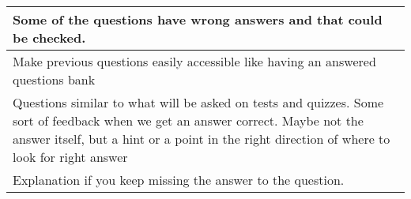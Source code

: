 \begin{longtable}{|p{1\linewidth}|}
		\hline
		Some of the questions have wrong answers and that could be checked.                                                                                                                                                                                                                                                                                                                                                                                                                                                                                                                                                                                                                              \\
		\hline
		Make previous questions easily accessible like having an answered questions bank                                                                                                                                                                                                                                                                                                                                                                                                                                                                                                                                                                                                                 \\
		\hline
		Questions similar to what will be asked on tests and quizzes. Some sort of feedback when we get an answer correct. Maybe not the answer itself, but a hint or a point in the right direction of where to look for right answer                                                                                                                                                                                                                                                                                                                                                                                                                                                                   \\
		\hline
		Explanation if you keep missing the answer to the question.                                                                                                                                                                                                                                                                                                                                                                                                                                                                                                                                                                                                                                      \\

\end{longtable}
